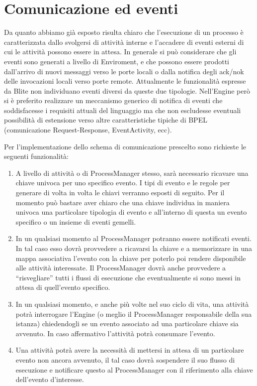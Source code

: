 \section{Comunicazione ed eventi}
Da quanto abbiamo già esposto risulta chiaro che l'esecuzione di un processo \`e
caratterizzata dallo svolgersi di attività interne e l'accadere di eventi
esterni di cui le attività possono essere in attesa. In generale si può
considerare che gli eventi sono generati a livello di Enviroment, e che possono
essere prodotti dall'arrivo di nuovi messaggi verso le porte locali o
dalla notifica degli ack/nok delle invocazioni locali
verso porte remote. Attualmente le funzionalità espresse da Blite non
individuano eventi diversi da queste due tipologie. Nell'Engine però si \`e
preferito realizzare un meccanismo generico di notifica di eventi che
soddisfacesse i requisiti attuali del linguaggio ma che non escludesse eventuali
possibilità di estensione verso altre caratteristiche tipiche di BPEL
(comunicazione Request-Response, EventActivity, ecc).

Per l'implementazione dello schema di comunicazione prescelto sono richieste
le seguenti funzionalità:

\begin{enumerate}
  \item A livello di attività o di ProcessManager stesso,
  sarà necessario ricavare una chiave univoca per uno specifico 
  evento. I tipi di evento e le regole per generare di volta in
  volta le chiavi verranno esposti di seguito. Per il momento può bastare aver
  chiaro che una chiave individua in maniera univoca una particolare tipologia di evento e all'interno di questa un evento specifico o un insieme
  di eventi gemelli.
  
  \item In un qualsiasi momento al ProcessManager potranno essere notificati
  eventi. In tal caso esso dovrà provvedere a ricavarsi la chiave e a
  memorizzare in una mappa associativa l'evento con la chiave per poterlo poi
  rendere disponibile alle attività interessate. Il ProcessManager dovrà anche
  provvedere a ``risvegliare'' tutti i flussi di esecuzione che
  eventualmente si sono messi in attesa di quell'evento specifico.
   
  \item In un qualsiasi momento, e anche più volte nel suo ciclo di vita, una
  attività potrà interrogare l'Engine (o meglio il ProcessManager responsabile
  della sua istanza) chiedendogli se un evento associato ad una particolare
  chiave sia avvenuto. In caso affermativo l'attività potrà consumare l'evento.

  \item Una attività potrà avere la necessità di mettersi in attesa di un
  particolare evento non ancora avvenuto, il tal caso dovrà sospendere il
  suo flusso di esecuzione e notificare questo al ProcessManager
  con il riferimento alla chiave dell'evento d'interesse. 
\end{enumerate}

